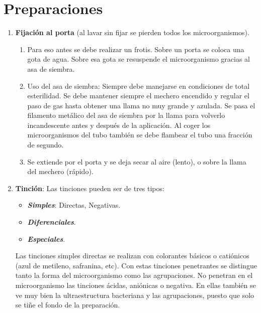 \section{Preparaciones}
\begin{enumerate}[itemsep=0pt,parsep=0pt,topsep=0pt,partopsep=0pt]
	\item \textbf{Fijación al porta} (al lavar sin fijar se pierden todos los microorganismos). 
	\begin{enumerate}[itemsep=0pt,parsep=0pt,topsep=0pt,partopsep=0pt]
		\item Para eso antes se debe realizar un frotis. Sobre un porta se coloca una gota de agua. Sobre esa gota se resuspende el microorganismo gracias al asa de siembra.
		\item Uso del asa de siembra: Siempre debe manejarse en condiciones de total esterilidad. Se debe mantener siempre el mechero encendido y regular el paso de gas hasta obtener una llama no muy grande y azulada. Se pasa el filamento metálico del asa de siembra por la llama para volverlo incandescente antes y después de la aplicación. Al coger los microorganismos del tubo también se debe flambear el tubo una fracción de segundo.
		\item Se extiende por el porta y se deja secar al aire (lento), o sobre la llama del mechero (rápido).
	\end{enumerate}
	\item \textbf{Tinción}: Las tinciones pueden ser de tres tipos:
	\begin{itemize}[itemsep=0pt,parsep=0pt,topsep=0pt,partopsep=0pt]
		\item \textit{\textbf{Simples}}: Directas, Negativas.
		\item \textit{\textbf{Diferenciales}}.
		\item \textit{\textbf{Especiales}}.
	\end{itemize}
	Las tinciones simples directas se realizan con colorantes básicos o catiónicos (azul de metileno, safranina, etc). Con estas tinciones penetrantes se distingue tanto la forma del microorganismo como las agrupaciones. No penetran en el microorganismo las tinciones ácidas, aniónicas o negativa. En ellas también se ve muy bien la ultraestructura bacteriana y las agrupaciones, puesto que solo se tiñe el fondo de la preparación.
\end{enumerate}
